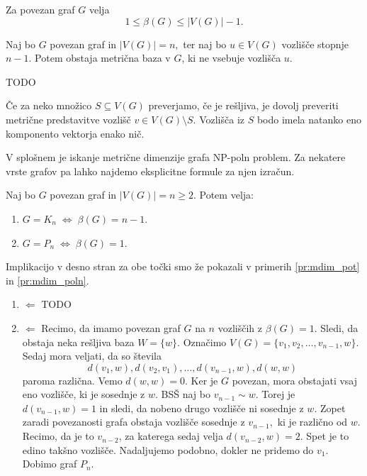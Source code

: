 \documentclass[mat1, tisk]{fmfdelo}
\newcommand{\1}{(1, 1, \ldots, 1)}
\newcommand{\2}{(2, 2, \ldots, 2)}
\begin{document}
\begin{posledica} \label{po:groba_omejitev_mdim}
    Za povezan graf $G$ velja 
    $$1 \leq \beta(G) \leq |V(G)| - 1. $$
\end{posledica}


\begin{lema} \label{lema:vozlisce_max_deg}
    Naj bo $G$ povezan graf in $|V(G)| = n,$ ter naj bo $u \in V(G)$ vozlišče stopnje $n-1.$
    Potem obstaja metrična baza v $G$, ki ne vsebuje vozlišča $u.$
\end{lema}

\begin{dokaz}
    TODO
\end{dokaz}

\begin{opomba} \label{op:zadostno_preverjanje}
    Če za neko množico $S \subseteq V(G)$ preverjamo, če je rešljiva, je dovolj preveriti metrične 
    predstavitve vozlišč $v \in V(G) \setminus S.$ Vozlišča iz $S$ bodo imela natanko eno komponento 
    vektorja enako nič. 
\end{opomba}
    

V splošnem je iskanje metrične dimenzije grafa NP-poln problem. Za nekatere vrste grafov
pa lahko najdemo eksplicitne formule za njen izračun.

\begin{trditev} \label{trd:mdim_polni_pot}
    Naj bo $G$ povezan graf in $|V(G)| = n \geq 2.$ Potem velja:
    \begin{enumerate}
        \item $G = K_n \; \Leftrightarrow \; \beta(G) = n - 1.$
        \item $G = P_n \; \Leftrightarrow \; \beta(G) = 1.$
    \end{enumerate} 
\end{trditev}

\begin{dokaz}
    Implikacijo v desno stran za obe točki smo že pokazali v primerih \ref{pr:mdim_pot} in 
    \ref{pr:mdim_poln}.
    \begin{enumerate}
        \item $\Leftarrow$  TODO
        \item $\Leftarrow$
        Recimo, da imamo povezan graf $G$ na $n$ vozliščih z $\beta(G) = 1.$ Sledi, da obstaja neka 
        rešljiva baza $W = \{ w \}.$ Označimo $V(G) = \{ v_1, v_2, \ldots , v_{n-1}, w\}.$ Sedaj mora 
        veljati, da so števila 
        $$ d(v_1, w),  d(v_2, v_1), \ldots, d(v_{n-1}, w), d(w, w) $$
        paroma različna. Vemo $d(w, w) = 0$. Ker je $G$ povezan, mora obstajati vsaj eno vozlišče, 
        ki je sosednje z $w$. BSŠ naj bo $v_{n-1} \sim w$. Torej je $d(v_{n-1}, w) = 1$ in sledi, 
        da nobeno drugo vozlišče ni sosednje z $w$. Zopet zaradi povezanosti grafa obstaja vozlišče 
        sosednje z $v_{n-1},$ ki je različno od $w$. Recimo, da je to $v_{n-2}$, za katerega sedaj 
        velja $d(v_{n-2}, w) = 2.$ Spet je to edino takšno vozlišče. Nadaljujemo podobno, 
        dokler ne pridemo do $v_1.$ Dobimo graf $P_n.$
    \end{enumerate}
\end{dokaz}
\end{document}
